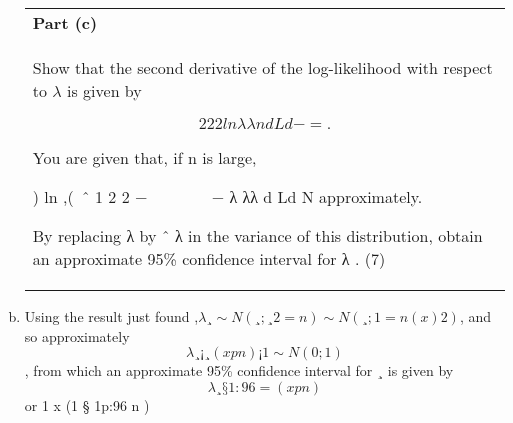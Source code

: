 \documentclass[a4paper,12pt]{article}
\begin{document}
\begin{enumerate}[(a)]

 
  \begin{table}[ht!]
  \centering
  \begin{tabular}{|p{15cm}|}
  \hline 
\noindent \textbf{Part (c)} \\Show that the second derivative of the log-likelihood with respect to $\lambda$ is 
given by 
 
\[   2 2 2 ln λλ n d Ld −= . \]
 
  You are given that, if n is large, 
 
   ) ln ,(~ˆ 1 2 2 −       − λ λλ d Ld N approximately. 
 
  By replacing λ by ˆ λ  in the variance of this distribution, obtain an approximate 95\% confidence interval for λ . (7) 
  
\\ \hline 
   \end{tabular}
 \end{table}
\item  Using the result just found ,$\lambda¸ \sim N(¸; ¸2=n) \sim N(¸; 1=n(x)2)$, and so approximately
\[\lambda¸
¡¸
(x
p
n)¡1 \sim N(0; 1)\], from which an approximate 95\% confidence interval for ¸ is given by
\[\lambda¸
§ 1:96=(x
p
n)\] or 1
x (1 § 1p:96
n )
\end{enumerate}
\end{document}
